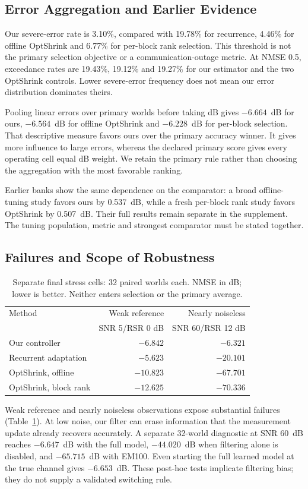 \documentclass[10pt,journal,letterpaper]{IEEEtran}
\begin{document}
\subsection{Error Aggregation and Earlier Evidence}
Our severe-error rate is 3.10\%, compared with 19.78\% for recurrence, 4.46\% for offline OptShrink and 6.77\% for per-block rank selection. This threshold is not the primary selection objective or a communication-outage metric. At NMSE 0.5, exceedance rates are 19.43\%, 19.12\% and 19.27\% for our estimator and the two OptShrink controls. Lower severe-error frequency does not mean our error distribution dominates theirs.

Pooling linear errors over primary worlds before taking dB gives $-6.664$~dB for ours, $-6.564$~dB for offline OptShrink and $-6.228$~dB for per-block selection. That descriptive measure favors ours over the primary accuracy winner. It gives more influence to large errors, whereas the declared primary score gives every operating cell equal dB weight. We retain the primary rule rather than choosing the aggregation with the most favorable ranking.

Earlier banks show the same dependence on the comparator: a broad offline-tuning study favors ours by 0.537~dB, while a fresh per-block rank study favors OptShrink by 0.507~dB. Their full results remain separate in the supplement. The tuning population, metric and strongest comparator must be stated together.

\subsection{Failures and Scope of Robustness}
\begin{table}[!t]
\caption{Separate final stress cells: 32 paired worlds each. NMSE in dB; lower is better. Neither enters selection or the primary average.}
\label{tab:stress}\centering\footnotesize\setlength{\tabcolsep}{4pt}
\begin{tabular}{@{}lrr@{}}\toprule
Method & Weak reference & Nearly noiseless\\
 & SNR 5/RSR 0 dB & SNR 60/RSR 12 dB\\\midrule
Our controller & $-6.842$ & $-6.321$\\
Recurrent adaptation & $-5.623$ & $-20.101$\\
OptShrink, offline & $-10.823$ & $-67.701$\\
OptShrink, block rank & $-12.625$ & $-70.336$\\\bottomrule
\end{tabular}
\end{table}
Weak reference and nearly noiseless observations expose substantial failures (Table~\ref{tab:stress}). At low noise, our filter can erase information that the measurement update already recovers accurately. A separate 32-world diagnostic at SNR 60~dB reaches $-6.647$~dB with the full model, $-44.020$~dB when filtering alone is disabled, and $-65.715$~dB with EM100. Even starting the full learned model at the true channel gives $-6.653$~dB. These post-hoc tests implicate filtering bias; they do not supply a validated switching rule.
\end{document}
